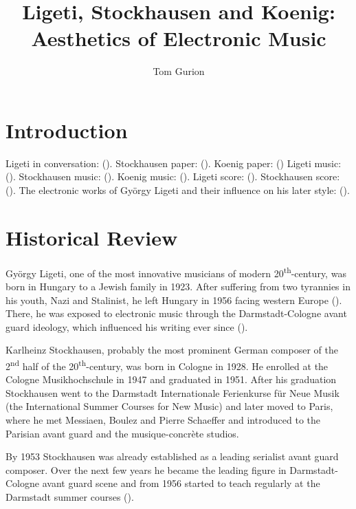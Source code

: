 \documentclass[a4paper,11pt]{article}
\title{Ligeti, Stockhausen and Koenig:\\Aesthetics of Electronic Music}
\author{Tom Gurion}
\begin{document}
\maketitle
\tableofcontents

\section{Introduction}
\label{sec:introduction}

Ligeti in conversation: (\cite{varnai}).
Stockhausen paper: (\cite{stockhausen}).
Koenig paper: (\cite{koenig})
Ligeti music: (\cite{rami_music}).
Stockhausen music: (\cite{gesang_music}).
Koenig music: (\cite{todo_music}).
Ligeti score: (\cite{rami}).
Stockhausen score: (\cite{gesang}).
The electronic works of Gy{\"o}rgy Ligeti and their influence on his later style: (\cite{levy2006}).

\section{Historical Review}
\label{sec:historical_Review}

Gy{\"o}rgy Ligeti, one of the most innovative musicians of modern 20\textsuperscript{th}-century, was born in Hungary to a Jewish family in 1923.
After suffering from two tyrannies in his youth, Nazi and Stalinist, he left Hungary in 1956 facing western Europe (\cite{ligeti_grove}).
There, he was exposed to electronic music through the Darmstadt-Cologne avant guard ideology, which influenced his writing ever since (\cite[p. TODO]{levy2006}).

Karlheinz Stockhausen, probably the most prominent German composer of the 2\textsuperscript{nd} half of the 20\textsuperscript{th}-century, was born in Cologne in 1928.
He enrolled at the Cologne Musikhochschule in 1947 and graduated in 1951.
After his graduation Stockhausen went to the Darmstadt Internationale Ferienkurse f{\"u}r Neue Musik (the International Summer Courses for New Music) and later moved to Paris, where he met Messiaen, Boulez and Pierre Schaeffer and introduced to the Parisian avant guard and the musique-concr{\`e}te studios.

By 1953 Stockhausen was already established as a leading serialist avant guard composer.
Over the next few years he became the leading figure in Darmstadt-Cologne avant guard scene and from 1956 started to teach regularly at the Darmstadt summer courses (\cite{stockhausen_grove}).
\end{document}
